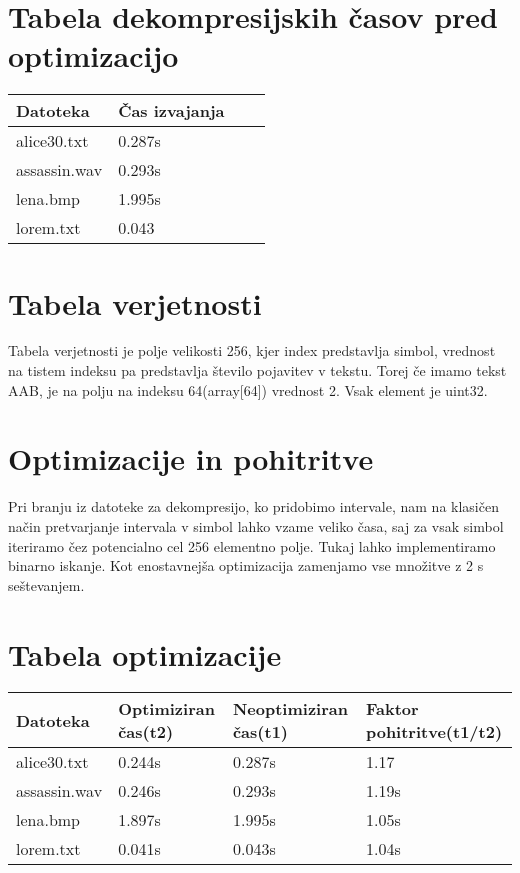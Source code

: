 \documentclass[12pt,a4paper]{article}
\begin{document}
\section{Tabela dekompresijskih časov pred optimizacijo}
\begin{table}[H]
    \begin{tabular}{llll}
    Datoteka     & Čas izvajanja \\ \hline
    alice30.txt  & 0.287s              \\
    assassin.wav & 0.293s                      \\
    lena.bmp     & 1.995s              \\
    lorem.txt    & 0.043                           \\
    \end{tabular}
\end{table}
\section{Tabela verjetnosti}
Tabela verjetnosti je polje velikosti 256, kjer index predstavlja simbol,
vrednost na tistem indeksu pa predstavlja število pojavitev v tekstu. Torej če imamo tekst AAB, je na polju na indeksu 64(array[64]) vrednost 2.
Vsak element je uint32.
\section{Optimizacije in pohitritve}
Pri branju iz datoteke za dekompresijo, ko pridobimo intervale, nam na klasičen način pretvarjanje intervala v simbol lahko vzame veliko časa, saj za vsak simbol iteriramo čez potencialno cel 256 elementno polje. Tukaj lahko implementiramo binarno iskanje. Kot enostavnejša optimizacija zamenjamo vse množitve z 2 s seštevanjem.
\section{Tabela optimizacije}

\begin{table}[H]
    \begin{tabular}{llll}
    Datoteka     & Optimiziran čas(t2)     & Neoptimiziran čas(t1) & Faktor pohitritve(t1/t2) \\ \hline
    alice30.txt  & 0.244s  & 0.287s        & 1.17            \\
    assassin.wav & 0.246s  & 0.293s        & 1.19s       \\
    lena.bmp     & 1.897s  & 1.995s        & 1.05s           \\
    lorem.txt    & 0.041s  & 0.043s        & 1.04s          \\
    \end{tabular}
\end{table}
\end{document}
